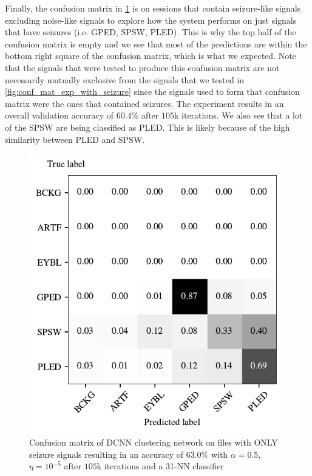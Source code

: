 Finally, the confusion matrix in \cref{fig:conf_mat_exp_with_only_seizure} is on sessions that contain seizure-like signals excluding noise-like signals to explore how the system performs on just signals that have seizures (i.e. GPED, SPSW, PLED). This is why the top half of the confusion matrix is empty and we see that most of the predictions are within the bottom right square of the confusion matrix, which is what we expected. Note that the signals that were tested to produce this confusion matrix are not necessarily mutually exclusive from the signals that we tested in \cref{fig:conf_mat_exp_with_seizure} since the signals used to form that confusion matrix were the ones that contained seizures. The experiment results in an overall validation accuracy of $60.4\%$ after $105$k iterations. We also see that a lot of the SPSW are being classified as PLED. This is likely because of the high similarity between PLED and SPSW.

\begin{figure}[!ht]
	\centering
	\includegraphics[width=0.7\linewidth]{pictures/conf_mat_exp_with_only_seizure.pdf}
	\caption[Confusion Matrix on Sessions with only Seizure-Like Signals]{Confusion matrix of DCNN clustering network on files with ONLY seizure signals resulting in an accuracy of $63.0\%$ with $\alpha = 0.5$, $\eta = 10^{-5}$ after $105$k iterations and a 31-NN classifier}\label{fig:conf_mat_exp_with_only_seizure}  
\end{figure}

